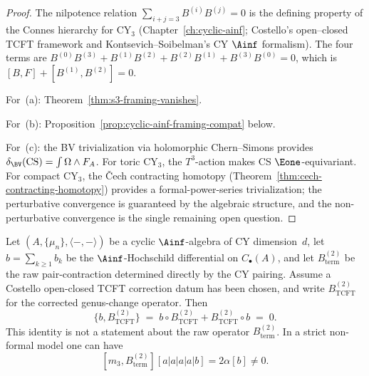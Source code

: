 \begin{proof}
The nilpotence relation $\sum_{i+j=3} B^{(i)} B^{(j)} = 0$ is the defining property of the Connes hierarchy for CY$_3$ (Chapter~\ref{ch:cyclic-ainf}; Costello's open--closed TCFT framework and Kontsevich--Soibelman's CY $\Ainf$ formalism). The four terms are $B^{(0)}B^{(3)} + B^{(1)}B^{(2)} + B^{(2)}B^{(1)} + B^{(3)}B^{(0)} = 0$, which is $[B,F] + [B^{(1)},B^{(2)}] = 0$.

For~(a): Theorem~\ref{thm:s3-framing-vanishes}.

For~(b): Proposition~\ref{prop:cyclic-ainf-framing-compat} below.

For~(c): the BV trivialization via holomorphic Chern--Simons provides $\delta_{\BV}(\mathrm{CS}) = \int \Omega \wedge F_A$. For toric CY$_3$, the $T^3$-action makes CS $\Eone$-equivariant. For compact CY$_3$, the \v{C}ech contracting homotopy (Theorem~\ref{thm:cech-contracting-homotopy}) provides a formal-power-series trivialization; the perturbative convergence is guaranteed by the algebraic structure, and the non-perturbative convergence is the single remaining open question.
\end{proof}


\begin{proposition}
\label{prop:cyclic-ainf-framing-compat}
Let $(A, \{\mu_n\}, \langle -,- \rangle)$ be a cyclic $\Ainf$-algebra
of CY dimension~$d$, let $b = \sum_{k \geq 1} b_k$ be the
$\Ainf$-Hochschild differential on $C_\bullet(A)$, and let
$B^{(2)}_{\mathrm{term}}$ be the raw pair-contraction determined
directly by the CY pairing. Assume a Costello open-closed TCFT
correction datum has been chosen, and write
$B^{(2)}_{\mathrm{TCFT}}$ for the corrected genus-change operator. Then
\[
 \{b, B^{(2)}_{\mathrm{TCFT}}\}
 \;=\;
 b \circ B^{(2)}_{\mathrm{TCFT}}
 + B^{(2)}_{\mathrm{TCFT}} \circ b
 \;=\; 0.
\]
This identity is not a statement about the raw operator
$B^{(2)}_{\mathrm{term}}$. In a strict non-formal model one can have
\[
 [m_3,B^{(2)}_{\mathrm{term}}][a|a|a|a|b]=2\alpha[b]\neq0 .
\]
\end{proposition}

